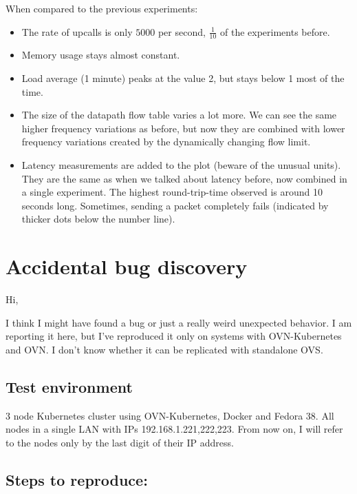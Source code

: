 When compared to the previous experiments:

\begin{itemize}
    \item The rate of upcalls is only $5000$ per second, $\frac{1}{10}$ of the experiments before.
    \item Memory usage stays almost constant.
    \item Load average (1 minute) peaks at the value 2, but stays below 1 most of the time.
    \item The size of the datapath flow table varies a lot more. We can see the same higher frequency variations as before, but now they are combined with lower frequency variations created by the dynamically changing flow limit.
    \item Latency measurements are added to the plot (beware of the unusual units). They are the same as when we talked about latency before, now combined in a single experiment. The highest round-trip-time observed is around 10 seconds long. Sometimes, sending a packet completely fails (indicated by thicker dots below the number line).
\end{itemize}


\section{Accidental bug discovery}

Hi,

I think I might have found a bug or just a really weird unexpected behavior. I am reporting it here, but I've reproduced it only on systems with OVN-Kubernetes and OVN. I don't know whether it can be replicated with standalone OVS.


\subsection{Test environment}


3 node Kubernetes cluster using OVN-Kubernetes, Docker and Fedora 38. All nodes in a single LAN with IPs 192.168.1.{221,222,223}. From now on, I will refer to the nodes only by the last digit of their IP address.


\subsection{Steps to reproduce:}


